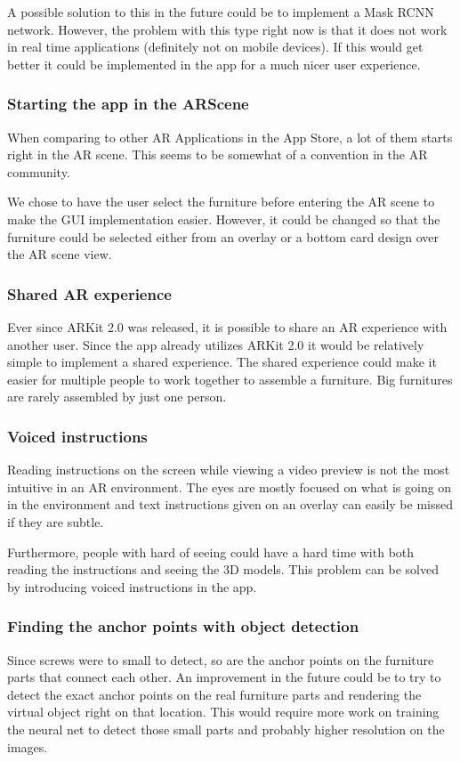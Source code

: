 A possible solution to this in the future could be to implement a Mask RCNN network. However, 
the problem with this type right now is that it does not work in real time applications (definitely not on mobile devices).
If this would get better it could be implemented in the app for a much nicer user experience.

\subsubsection{Starting the app in the ARScene}
When comparing to other AR Applications in the App Store, a lot of them starts right in the AR 
scene. This seems to be somewhat of a convention in the AR community.

We chose to have the user select the furniture before entering the AR scene to make the GUI
implementation easier. However, it could be changed so that the furniture could be selected
either from an overlay or a bottom card design over the AR scene view.

\subsubsection{Shared AR experience}
Ever since ARKit 2.0 was released, it is possible to share an AR experience with another user.
Since the app already utilizes ARKit 2.0 it would be relatively simple to implement a shared 
experience. The shared experience could make it easier for multiple people to work together to
assemble a furniture. Big furnitures are rarely assembled by just one person.

\subsubsection{Voiced instructions}
Reading instructions on the screen while viewing a video preview is not the most intuitive in an
AR environment. The eyes are mostly focused on what is going on in the environment and text
instructions given on an overlay can easily be missed if they are subtle.

Furthermore, people with hard of seeing could have a hard time with both reading the instructions
and seeing the 3D models. This problem can be solved by introducing voiced instructions in the app.

\subsubsection{Finding the anchor points with object detection}
Since screws were to small to detect, so are the anchor points on the furniture parts that connect
each other.
An improvement in the future could be to try to detect the exact anchor points on the
real furniture parts and rendering the virtual object right on that location. This would
require more work on training the neural net to detect those small parts and probably
higher resolution on the images.

